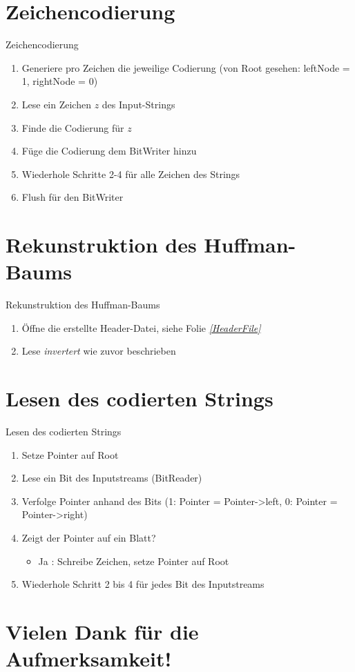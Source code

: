 \documentclass{beamer}
\begin{document}
  \section{Zeichencodierung}
  \begin{frame}{Zeichencodierung}
  	\begin{enumerate}
  		\item Generiere pro Zeichen die jeweilige Codierung \newline (von Root gesehen: leftNode = 1, rightNode = 0)
  		\item Lese ein Zeichen $z$ des Input-Strings
  		\item Finde die Codierung für $z$
  		\item Füge die Codierung dem BitWriter hinzu
  		\item Wiederhole Schritte 2-4 für alle Zeichen des Strings
  		\item Flush für den BitWriter
  	\end{enumerate}
  \end{frame}
  
  
  
  \section{Rekunstruktion des Huffman-Baums}
  \begin{frame}{Rekunstruktion des Huffman-Baums}
  	\begin{enumerate}
  		\item Öffne die erstellte Header-Datei, siehe Folie \textit{\ref{HeaderFile}}
  		\item Lese \textit{invertert} wie zuvor beschrieben
  	\end{enumerate}
  \end{frame}
  
  
  \section{Lesen des codierten Strings}
  \begin{frame}{Lesen des codierten Strings}
  	\begin{enumerate}
  		\item Setze Pointer auf Root
  		\item Lese ein Bit des Inputstreams (BitReader)
  		\item Verfolge Pointer anhand des Bits \newline (1: Pointer = Pointer->left, 0: Pointer = Pointer->right)
  		\item Zeigt der Pointer auf ein Blatt?
  		\begin{itemize}
  			\item Ja  : Schreibe Zeichen, setze Pointer auf Root
  		\end{itemize}
  		\item Wiederhole Schritt 2 bis 4 für jedes Bit des Inputstreams
  	\end{enumerate}
  \end{frame}
  
  

\section*{Vielen Dank für die Aufmerksamkeit!}
  
\end{document}
